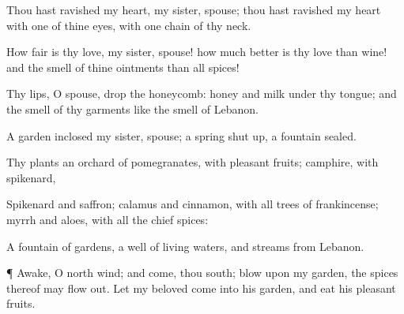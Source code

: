 {Thou hast ravished my
heart, my
sister,
{}
spouse; thou hast ravished my
heart with
one of thine
eyes, with
one
chain of thy
neck.

How
fair is thy
love, my
sister,
{}
spouse! how much
better is thy
love than
wine! and the
smell of thine
ointments than all
spices!

Thy
lips, O
{}
spouse,
drop
{} the
honeycomb:
honey and
milk
{} under thy
tongue; and the
smell of thy
garments
{} like the
smell of
Lebanon.

A
garden
inclosed
{} my
sister,
{}
spouse; a
spring shut
up, a
fountain
sealed.

Thy
plants
{} an
orchard of
pomegranates, with
pleasant
fruits;
camphire, with
spikenard,

Spikenard and
saffron;
calamus and
cinnamon, with all
trees of
frankincense;
myrrh and
aloes, with all the
chief
spices:


\par }{\PP {}A
fountain of
gardens, a
well of
living
waters, and
streams from
Lebanon.


\par }{\PP {}¶
Awake, O north
wind; and
come, thou
south;
blow upon my
garden,
{} the
spices thereof may flow
out. Let my
beloved
come into his
garden, and
eat his
pleasant
fruits.




\par }

